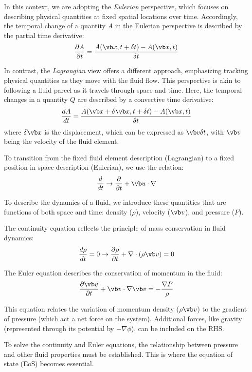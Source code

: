 In this context, we are adopting the \emph{Eulerian} perspective, which focuses on describing physical quantities at fixed spatial locations  over time. 
%
Accordingly, the temporal change of a quantity \(A\) in the Eulerian perspective is described by the partial time derivative:
%
\[
\frac{\partial A}{\partial t} = \frac{A(\vb x, t +\delta t) - A(\vb x, t)}{\delta t} 
\]

In contrast, the \emph{Lagrangian} view offers a different approach, emphasizing tracking physical quantities as they move with the fluid flow. This perspective is akin to following a fluid parcel as it travels through space and time. Here, the temporal changes in a quantity \(Q\) are described by a convective time derivative:
%
\[
\frac{d A}{dt} = \frac{A(\vb x + \delta \vb x, t + \delta t) - A(\vb x, t)}{\delta t} 
\]
%
where \( \delta \vb x \) is the displacement, which can be expressed as \( \vb v \delta t \), with \( \vb v \) being the velocity of the fluid element.

To transition from the fixed fluid element description (Lagrangian) to a fixed position in space description (Eulerian), we use the relation:
%
\begin{equation}
\frac{d}{dt} \rightarrow \frac{\partial}{\partial t} + \vb u \cdot \nabla
\end{equation}

To describe the dynamics of a fluid, we introduce these quantities that are functions of both space and time: density (\( \rho \)), velocity (\( \vb v \)), and pressure (\( P \)).

The continuity equation reflects the principle of mass conservation in fluid dynamics:
%
\begin{equation}
\frac{d\rho}{dt}  = 0 \rightarrow \frac{\partial \rho}{\partial t} + \nabla \cdot (\rho \vb v) = 0
\end{equation}

The Euler equation describes the conservation of momentum in the fluid:
%
\begin{equation}
\frac{\partial \vb v}{\partial t} + \vb v \cdot \nabla \vb v = - \frac{\nabla P}{\rho}
\end{equation}

This equation relates the variation of momentum density (\( \rho \vb v \)) to the gradient of pressure (which act a net force on the system).
%
Additional forces, like gravity (represented through its potential by \( - \nabla \phi \)), can be included on the RHS.

To solve the continuity and Euler equations, the relationship between pressure and other fluid properties must be established. This is where the equation of state (EoS) becomes essential.

